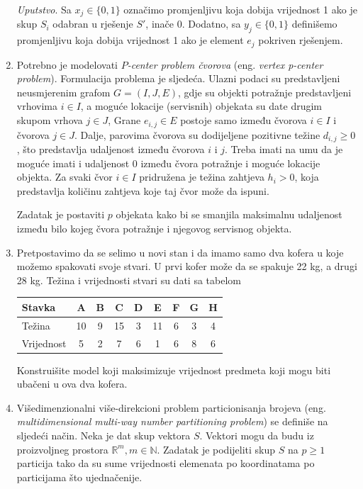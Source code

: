 \documentclass[a4paper, utf8, 11pt, colorlinks]{book}
\theoremstyle{definition}
\begin{document}
\begin{enumerate}
	\emph{Uputstvo}. Sa $x_j \in \{0, 1\}$ označimo promjenljivu koja dobija vrijednost 1 ako je skup $S_i$ odabran u rješenje $S'$, inače 0. Dodatno, sa $y_j \in \{0, 1 \}$ definišemo promjenljivu koja dobija vrijednost 1 ako je   element $e_j$ pokriven rješenjem.  
	\item Potrebno je modelovati \emph{$P$-center problem čvorova} (eng. \emph{vertex p-center problem}). Formulacija problema je sljedeća. Ulazni podaci su predstavljeni neusmjerenim grafom $G = (I, J, E)$, gdje su objekti potražnje predstavljeni  vrhovima $i\in I$, a moguće lokacije (servisnih) objekata su date   drugim skupom vrhova $j \in J$, Grane $e_{i,j} \in E$ postoje samo između čvorova $i \in  I$ i čvorova $j \in J$. Dalje, parovima čvorova su dodijeljene pozitivne težine $d_{i,j}\geq 0$, što predstavlja udaljenost između čvorova $i$ i $j$. Treba imati na umu da je moguće imati i udaljenost 0 između čvora potražnje i moguće lokacije objekta. Za svaki čvor $i \in I$ pridružena je težina zahtjeva $h_i>0$, koja predstavlja količinu zahtjeva koje taj čvor može da ispuni. 
	
	Zadatak je postaviti $p$ objekata kako bi se smanjila maksimalnu udaljenost između bilo kojeg čvora potražnje i	njegovog servisnog objekta. 
	\item %
	 Pretpostavimo da se selimo u novi stan i da imamo samo dva kofera u koje možemo spakovati svoje stvari. U prvi kofer može da se spakuje 22 kg, a drugi 28 kg. Težina i vrijednosti stvari
	su dati sa tabelom
 \begin{table}[H]
 	\centering
	\begin{tabular}{l|cccccccc}
		Stavka & A & B & C & D & E & F & G & H \\ \hline
		Težina & 10 & 9 & 15 & 3 & 11 & 6 & 3 & 4 \\
		Vrijednost & 5 & 2 & 7 & 6 & 1 & 6 & 8 & 6 \\ \hline
	\end{tabular} 
    
 \end{table}
Konstruišite model koji maksimizuje vrijednost  predmeta koji mogu biti ubačeni u ova dva kofera. 
\item Višedimenzionalni više-direkcioni problem particionisanja brojeva (eng. \emph{multidimensional multi-way number partitioning problem}) se definiše na sljedeći način. Neka je dat skup vektora $S$. Vektori mogu da budu iz proizvoljneg prostora $\mathbb{R}^m, m \in \mathbb{N}$.   Zadatak je podijeliti skup $S$ na $p \geq 1$ particija tako da su sume vrijednosti  elemenata  po koordinatama po particijama što ujednačenije. 


\end{enumerate}
\end{document}
